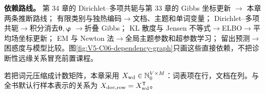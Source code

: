 \documentclass[UTF8,a4paper,11pt,openany]{ctexbook}
\begin{document}
\setcounter{page}{855}
\setcounter{chapter}{35}
\setcounter{section}{0}
\setcounter{figure}{0}
\pagestyle{headings}
\textbf{依赖路线。}
第 34 章的 Dirichlet--多项共轭与第 33 章的 Gibbs 坐标更新 $\to$ 本章两条推断路线；
有限类别与独热编码$\to$文档、主题和单词变量；
Dirichlet--多项共轭$\to$积分消去$\boldsymbol\theta,\boldsymbol\varphi$
$\to$折叠 Gibbs；
KL 散度与 Jensen 不等式$\to$ELBO$\to$平均场坐标更新；
EM 与 Newton 法$\to$全局主题参数和超参数学习；
留出预测$\to$困惑度与模型比较。图\ref{fig:V5-C06-dependency-graph}只画这些直接依赖，不把诊断性远缘关系冒充前置课程。\par\medskip

\FloatBarrier
\begin{keypointbox}[title=数据方向桥：LDA 语料仍按列放文档]
若把词元压缩成计数矩阵，本章采用 $X_{\rm wd}\in\mathbb N_0^{V\times M}$：词表项在行，文档在列。与全书默认行样本表示的关系为 $X_{{\rm doc},{\rm row}}=X_{\rm wd}^{\mathsf T}$。
\end{keypointbox}
\end{document}
